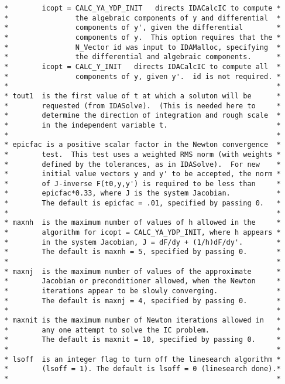 \begin{verbatim}
 *        icopt = CALC_YA_YDP_INIT   directs IDACalcIC to compute *
 *                the algebraic components of y and differential  *
 *                components of y', given the differential        *
 *                components of y.  This option requires that the *
 *                N_Vector id was input to IDAMalloc, specifying  *
 *                the differential and algebraic components.      *
 *        icopt = CALC_Y_INIT   directs IDACalcIC to compute all  *
 *                components of y, given y'.  id is not required. *
 *                                                                *
 * tout1  is the first value of t at which a soluton will be      *
 *        requested (from IDASolve).  (This is needed here to     *
 *        determine the direction of integration and rough scale  *
 *        in the independent variable t.                          *
 *                                                                *
 * epicfac is a positive scalar factor in the Newton convergence  *
 *        test.  This test uses a weighted RMS norm (with weights *
 *        defined by the tolerances, as in IDASolve).  For new    *
 *        initial value vectors y and y' to be accepted, the norm *
 *        of J-inverse F(t0,y,y') is required to be less than     *
 *        epicfac*0.33, where J is the system Jacobian.           *
 *        The default is epicfac = .01, specified by passing 0.   *
 *                                                                *
 * maxnh  is the maximum number of values of h allowed in the     *
 *        algorithm for icopt = CALC_YA_YDP_INIT, where h appears *
 *        in the system Jacobian, J = dF/dy + (1/h)dF/dy'.        *
 *        The default is maxnh = 5, specified by passing 0.       *
 *                                                                *
 * maxnj  is the maximum number of values of the approximate      *
 *        Jacobian or preconditioner allowed, when the Newton     *
 *        iterations appear to be slowly converging.              *
 *        The default is maxnj = 4, specified by passing 0.       *
 *                                                                *
 * maxnit is the maximum number of Newton iterations allowed in   *
 *        any one attempt to solve the IC problem.                *
 *        The default is maxnit = 10, specified by passing 0.     *
 *                                                                *
 * lsoff  is an integer flag to turn off the linesearch algorithm *
 *        (lsoff = 1). The default is lsoff = 0 (linesearch done).*
 *                                                                *

\end{verbatim}
